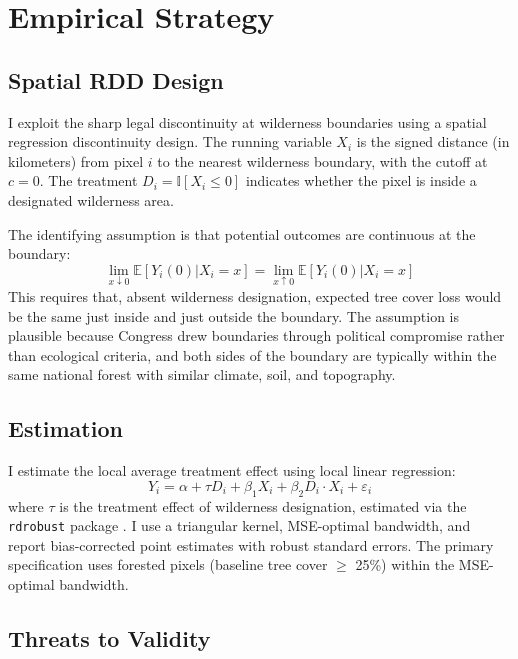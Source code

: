 \documentclass[12pt]{article}
\newcommand{\E}{\mathbb{E}}
\newcommand{\ind}{\mathbb{I}}
\begin{document}



\section{Empirical Strategy}

\subsection{Spatial RDD Design}

I exploit the sharp legal discontinuity at wilderness boundaries using a spatial regression discontinuity design. The running variable $X_i$ is the signed distance (in kilometers) from pixel $i$ to the nearest wilderness boundary, with the cutoff at $c = 0$. The treatment $D_i = \ind[X_i \leq 0]$ indicates whether the pixel is inside a designated wilderness area.

The identifying assumption is that potential outcomes are continuous at the boundary:
\begin{equation}
\lim_{x \downarrow 0} \E[Y_i(0) | X_i = x] = \lim_{x \uparrow 0} \E[Y_i(0) | X_i = x]
\end{equation}
This requires that, absent wilderness designation, expected tree cover loss would be the same just inside and just outside the boundary. The assumption is plausible because Congress drew boundaries through political compromise rather than ecological criteria, and both sides of the boundary are typically within the same national forest with similar climate, soil, and topography.

\subsection{Estimation}

I estimate the local average treatment effect using local linear regression:
\begin{equation}
Y_i = \alpha + \tau D_i + \beta_1 X_i + \beta_2 D_i \cdot X_i + \varepsilon_i
\end{equation}
where $\tau$ is the treatment effect of wilderness designation, estimated via the \texttt{rdrobust} package \citep{CattaneoEtAl2020}. I use a triangular kernel, MSE-optimal bandwidth, and report bias-corrected point estimates with robust standard errors. The primary specification uses forested pixels (baseline tree cover $\geq$ 25\%) within the MSE-optimal bandwidth.

\subsection{Threats to Validity}
\end{document}
